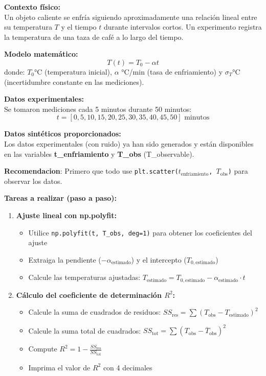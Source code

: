\documentclass[10pt]{article}
\begin{document}
\begin{tcolorbox}[title={Pregunta 1 – Ley de Enfriamiento de Newton (np.polyfit)}]

\noindent\textbf{Contexto físico:}\\
Un objeto caliente se enfría siguiendo aproximadamente una relación lineal entre su temperatura $T$ y el tiempo $t$ durante intervalos cortos. Un experimento registra la temperatura de una taza de café a lo largo del tiempo.

\noindent\textbf{Modelo matemático:}
\[
T(t) = T_0 - \alpha t
\]
donde: $T_0$°C (temperatura inicial), $\alpha$ °C/min (tasa de enfriamiento) y $\sigma_T$°C (incertidumbre constante en las mediciones).

\noindent\textbf{Datos experimentales:}\\
Se tomaron mediciones cada 5 minutos durante 50 minutos:
\[
 t = [0, 5, 10, 15, 20, 25, 30, 35, 40, 45, 50] \text{ minutos}
\]


\noindent\textbf{Datos sintéticos proporcionados:}\\[0.3em] 
Los datos experimentales (con ruido) ya han sido generados y están disponibles en las variables \textbf{t\_enfriamiento} y \textbf{T\_obs} ({T\_observable}).

\noindent\textbf{Recomendacion}: Primero que todo use \texttt{plt.scatter($t_{\text{enfriamiento}}$, $T_{\text{obs}}$)} para observar los datos.

\noindent\textbf{Tareas a realizar (paso a paso):}

\begin{enumerate}
  \item \textbf{Ajuste lineal con np.polyfit:}
  \begin{itemize}
    \item Utilice \texttt{np.polyfit(t, T\_obs, deg=1)} para obtener los coeficientes del ajuste
    \item Extraiga la pendiente ($-\alpha_{\text{estimado}}$) y el intercepto ($T_{0,\text{estimado}}$)
    \item Calcule las temperaturas ajustadas: $T_{\text{estimado}} = T_{0,\text{estimado}} - \alpha_{\text{estimado}} \cdot t$
  \end{itemize}
  
  \item \textbf{Cálculo del coeficiente de determinación $R^2$:}
  \begin{itemize}
    \item Calcule la suma de cuadrados de residuos: $SS_{\text{res}} = \sum (T_{\text{obs}} - T_{\text{estimado}})^2$
    \item Calcule la suma total de cuadrados: $SS_{\text{tot}} = \sum (T_{\text{obs}} - \overline{T}_{\text{obs}})^2$
    \item Compute $R^2 = 1 - \frac{SS_{\text{res}}}{SS_{\text{tot}}}$
    \item Imprima el valor de $R^2$ con 4 decimales
  \end{itemize}
  

\end{enumerate}
\end{tcolorbox}
\end{document}
